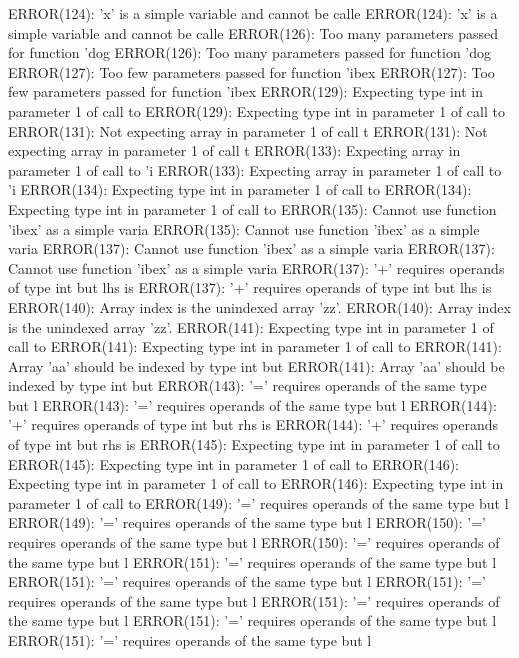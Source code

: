 \documentclass[12pt]{book}
\begin{document}
ERROR(124): 'x' is a simple variable and cannot be calle        ERROR(124): 'x' is a simple variable and cannot be calle
ERROR(126): Too many parameters passed for function 'dog        ERROR(126): Too many parameters passed for function 'dog
ERROR(127): Too few parameters passed for function 'ibex        ERROR(127): Too few parameters passed for function 'ibex
ERROR(129): Expecting type int in parameter 1 of call to        ERROR(129): Expecting type int in parameter 1 of call to
ERROR(131): Not expecting array in parameter 1 of call t        ERROR(131): Not expecting array in parameter 1 of call t
ERROR(133): Expecting array in parameter 1 of call to 'i        ERROR(133): Expecting array in parameter 1 of call to 'i
ERROR(134): Expecting type int in parameter 1 of call to        ERROR(134): Expecting type int in parameter 1 of call to
ERROR(135): Cannot use function 'ibex' as a simple varia        ERROR(135): Cannot use function 'ibex' as a simple varia
ERROR(137): Cannot use function 'ibex' as a simple varia        ERROR(137): Cannot use function 'ibex' as a simple varia
ERROR(137): '+' requires operands of type int but lhs is        ERROR(137): '+' requires operands of type int but lhs is
ERROR(140): Array index is the unindexed array 'zz'.                ERROR(140): Array index is the unindexed array 'zz'.
ERROR(141): Expecting type int in parameter 1 of call to        ERROR(141): Expecting type int in parameter 1 of call to
ERROR(141): Array 'aa' should be indexed by type int but        ERROR(141): Array 'aa' should be indexed by type int but
ERROR(143): '=' requires operands of the same type but l        ERROR(143): '=' requires operands of the same type but l
ERROR(144): '+' requires operands of type int but rhs is        ERROR(144): '+' requires operands of type int but rhs is
ERROR(145): Expecting type int in parameter 1 of call to        ERROR(145): Expecting type int in parameter 1 of call to
ERROR(146): Expecting type int in parameter 1 of call to        ERROR(146): Expecting type int in parameter 1 of call to
ERROR(149): '=' requires operands of the same type but l        ERROR(149): '=' requires operands of the same type but l
ERROR(150): '=' requires operands of the same type but l        ERROR(150): '=' requires operands of the same type but l
ERROR(151): '=' requires operands of the same type but l        ERROR(151): '=' requires operands of the same type but l
ERROR(151): '=' requires operands of the same type but l        ERROR(151): '=' requires operands of the same type but l
ERROR(151): '=' requires operands of the same type but l        ERROR(151): '=' requires operands of the same type but l
\end{document}

